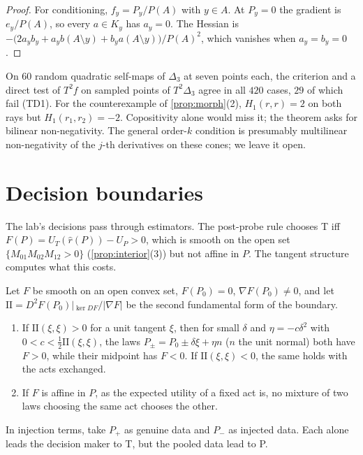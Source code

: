 \documentclass[11pt]{article}
\theoremstyle{definition}\newtheorem{definition}[theorem]{Definition}\newtheorem{remark}[theorem]{Remark}\newtheorem{example}[theorem]{Example}
\begin{document}
\begin{proof}
For conditioning, $f_y=P_y/P(A)$ with $y\in A$. At $P_y=0$ the gradient is $e_y/P(A)$, so every $a\in K_y$ has $a_y=0$. The Hessian is
$-\bigl(2a_yb_y+a_yb(A\setminus y)+b_ya(A\setminus y)\bigr)/P(A)^2$, which vanishes when $a_y=b_y=0$.
\end{proof}

On $60$ random quadratic self-maps of $\Delta_3$ at seven points each, the criterion and a direct test of $T^2f$ on sampled points of
$T^2\Delta_3$ agree in all $420$ cases, $29$ of which fail (TD1). For the counterexample of \cref{prop:morph}(2), $H_1(r,r)=2$ on both
rays but $H_1(r_1,r_2)=-2$. Copositivity alone would miss it; the theorem asks for bilinear non-negativity. The general order-$k$ condition
is presumably multilinear non-negativity of the $j$-th derivatives on these cones; we leave it open.

\section{Decision boundaries}\label{sec:decide}
The lab's decisions pass through estimators. The post-probe rule chooses T iff $F(P)=U_T(\hat r(P))-U_P>0$, which is smooth on the open
set $\{M_{01}M_{02}M_{12}>0\}$ (\cref{prop:interior}(3)) but not affine in $P$. The tangent structure computes what this costs.

\begin{proposition}[pooling paradox = curvature]\label{prop:pool}
Let $F$ be smooth on an open convex set, $F(P_0)=0$, $\nabla F(P_0)\ne0$, and let $\mathrm{II}=D^2F(P_0)|_{\ker DF}/|\nabla F|$ be the second
fundamental form of the boundary.
\begin{enumerate}
\item[(1)] If $\mathrm{II}(\xi,\xi)>0$ for a unit tangent $\xi$, then for small $\delta$ and $\eta=-c\delta^2$ with
  $0<c<\tfrac12\mathrm{II}(\xi,\xi)$, the laws $P_\pm=P_0\pm\delta\xi+\eta n$ ($n$ the unit normal) both have $F>0$, while their
  midpoint has $F<0$. If $\mathrm{II}(\xi,\xi)<0$, the same holds with the acts exchanged.
\item[(2)] If $F$ is affine in $P$, as the expected utility of a fixed act is, no mixture of two laws choosing the same act chooses the
  other.
\end{enumerate}
In injection terms, take $P_+$ as genuine data and $P_-$ as injected data. Each alone leads the decision maker to T, but the pooled data
lead to P.
\end{proposition}
\end{document}
